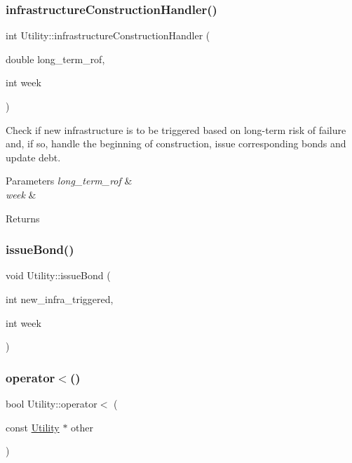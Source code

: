 \subsubsection{\texorpdfstring{infrastructure\+Construction\+Handler()}{infrastructureConstructionHandler()}}
{\footnotesize\ttfamily int Utility\+::infrastructure\+Construction\+Handler (\begin{DoxyParamCaption}\item[{double}]{long\+\_\+term\+\_\+rof,  }\item[{int}]{week }\end{DoxyParamCaption})}

Check if new infrastructure is to be triggered based on long-\/term risk of failure and, if so, handle the beginning of construction, issue corresponding bonds and update debt. 
\begin{DoxyParams}{Parameters}
{\em long\+\_\+term\+\_\+rof} & \\
\hline
{\em week} & \\
\hline
\end{DoxyParams}
\begin{DoxyReturn}{Returns}

\end{DoxyReturn}
\mbox{\label{classUtility_a152ceea2917ea7715e8fbf8aff24390f}} 
\subsubsection{\texorpdfstring{issue\+Bond()}{issueBond()}}
{\footnotesize\ttfamily void Utility\+::issue\+Bond (\begin{DoxyParamCaption}\item[{int}]{new\+\_\+infra\+\_\+triggered,  }\item[{int}]{week }\end{DoxyParamCaption})}

\mbox{\label{classUtility_ae2dad8029e34c5bb073a5ddf4381d278}} 
\subsubsection{\texorpdfstring{operator$<$()}{operator<()}}
{\footnotesize\ttfamily bool Utility\+::operator$<$ (\begin{DoxyParamCaption}\item[{const \mbox{\hyperlink{classUtility}{Utility}} $\ast$}]{other }\end{DoxyParamCaption})}

